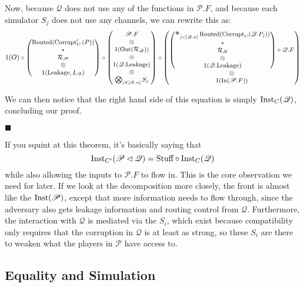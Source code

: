 \begin{theorem}
Now, because $\mathscr{Q}$ does not use any of the functions
in $\mathscr{P}.F$, and because each simulator $S_j$
does not use any channels, we can rewrite this as:
$$
\small
1(O) \circ
\begin{pmatrix}
  \tx{Routed}(\tx{Corrupt}'_{\tx{C'}}(P))\cr
  *\cr
  \mathcal{R}_{\mathscr{P}}\cr
  \otimes\cr
  1(\tx{Leakage}, L_{\mathscr{Q}})
\end{pmatrix}
\circ
\begin{pmatrix}
  \mathscr{P}.F\cr
  \otimes\cr
  1(\tx{Out}(\mathcal{R}_{\mathscr{Q}}))\cr
  \otimes\cr
  1(\mathscr{Q}.\tx{Leakage})\cr
  \otimes\cr
  \bigotimes_{j \in [\mathscr{Q}.n]} S_j
\end{pmatrix}
\circ
\begin{pmatrix}
\begin{pmatrix}
\bigast_{j \in [\mathscr{Q}.n]}
  \tx{Routed}(\tx{Corrupt}_C(\mathscr{Q}.P_j))
  \cr
  *\cr
  \mathcal{R}_{\mathscr{Q}}\cr
  \otimes\cr
  1(\mathscr{Q}.\tx{Leakage})
\end{pmatrix}
\circ
  \mathscr{Q}.F
  \cr
  \otimes\cr
  1(\tx{In}(\mathscr{P}.F))
\end{pmatrix}
$$

We can then notice that the right hand side of this equation
is simply $\text{Inst}_C(\mathscr{Q})$,
concluding our proof.

$\blacksquare$

\end{theorem}

If you squint at this theorem, it's basically saying
that
$$
\text{Inst}_{C'}(\mathscr{P} \lhd \mathscr{Q})
= \text{Stuff} \circ \text{Inst}_C(\mathscr{Q})
$$
while also allowing the inputs to $\mathscr{P}.F$ to flow in.
This is the core observation we need for later.
If we look at the decomposition more closely,
the front is almost like
the $\text{Inst}(\mathscr{P})$, except that more information
needs to flow through, since the adversary
also gets leakage information and routing control from $\mathscr{Q}$.
Furthermore, the interaction with $\mathscr{Q}$ is mediated
via the $S_i$, which exist because compatibility
only requires that the corruption in $\mathscr{Q}$ is at least as strong,
so these $S_i$ are there to weaken what the players in $\mathscr{P}$
have access to.

\subsection{Equality and Simulation}

